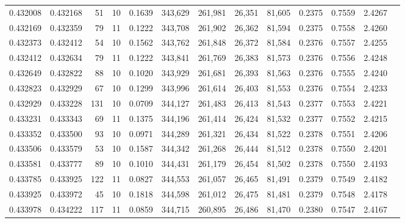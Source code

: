 \begin{tabular}{rrrrrrrrrrrrr}
0.432008 & 0.432168 &    51 &  10 &                                     0.1639 & 343,629 & 261,981 &  26,351 &  81,605 & 0.2375 & 0.7559 & 2.4267 \\
0.432169 & 0.432359 &    79 &  11 &                                     0.1222 & 343,708 & 261,902 &  26,362 &  81,594 & 0.2375 & 0.7558 & 2.4260 \\
0.432373 & 0.432412 &    54 &  10 &                                     0.1562 & 343,762 & 261,848 &  26,372 &  81,584 & 0.2376 & 0.7557 & 2.4255 \\
0.432412 & 0.432634 &    79 &  11 &                                     0.1222 & 343,841 & 261,769 &  26,383 &  81,573 & 0.2376 & 0.7556 & 2.4248 \\
0.432649 & 0.432822 &    88 &  10 &                                     0.1020 & 343,929 & 261,681 &  26,393 &  81,563 & 0.2376 & 0.7555 & 2.4240 \\
0.432823 & 0.432929 &    67 &  10 &                                     0.1299 & 343,996 & 261,614 &  26,403 &  81,553 & 0.2376 & 0.7554 & 2.4233 \\
0.432929 & 0.433228 &   131 &  10 &                                     0.0709 & 344,127 & 261,483 &  26,413 &  81,543 & 0.2377 & 0.7553 & 2.4221 \\
0.433231 & 0.433343 &    69 &  11 &                                     0.1375 & 344,196 & 261,414 &  26,424 &  81,532 & 0.2377 & 0.7552 & 2.4215 \\
0.433352 & 0.433500 &    93 &  10 &                                     0.0971 & 344,289 & 261,321 &  26,434 &  81,522 & 0.2378 & 0.7551 & 2.4206 \\
0.433506 & 0.433579 &    53 &  10 &                                     0.1587 & 344,342 & 261,268 &  26,444 &  81,512 & 0.2378 & 0.7550 & 2.4201 \\
0.433581 & 0.433777 &    89 &  10 &                                     0.1010 & 344,431 & 261,179 &  26,454 &  81,502 & 0.2378 & 0.7550 & 2.4193 \\
0.433785 & 0.433925 &   122 &  11 &                                     0.0827 & 344,553 & 261,057 &  26,465 &  81,491 & 0.2379 & 0.7549 & 2.4182 \\
0.433925 & 0.433972 &    45 &  10 &                                     0.1818 & 344,598 & 261,012 &  26,475 &  81,481 & 0.2379 & 0.7548 & 2.4178 \\
0.433978 & 0.434222 &   117 &  11 &                                     0.0859 & 344,715 & 260,895 &  26,486 &  81,470 & 0.2380 & 0.7547 & 2.4167 \\

\end{tabular}
